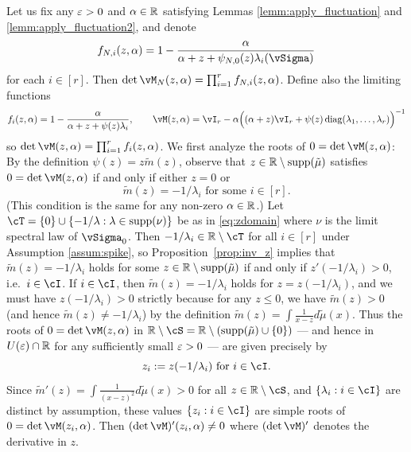 \begin{proof-of-theorem}
Let us fix any $\varepsilon>0$ and $\alpha \in \mathbb{R}$ satisfying Lemmas
\ref{lemm:apply_fluctuation} and \ref{lemm:apply_fluctuation2}, and denote 
\[f_{N,i}(z,\alpha)=1-\frac{\alpha}{\alpha+z+\psi_{N,0}(z)\lambda_i(\vSigma)}\]
for each $i \in [r]$.
Then $\det\vM_N(z,\alpha)=\prod_{i=1}^r f_{N,i}(z,\alpha)$. Define also the
limiting functions
\[f_i(z,\alpha)=1-\frac{\alpha}{\alpha+z+\psi(z)\lambda_i},
\qquad \vM(z,\alpha)=\vI_r-\alpha\Big((\alpha+z)\vI_r+\psi(z)
\diag(\lambda_1,\ldots,\lambda_r)\Big)^{-1}\]
so $\det \vM(z,\alpha)=\prod_{i=1}^r f_i(z,\alpha)$.
We first analyze the roots of $0=\det \vM(z,\alpha)$: By the
definition $\psi(z)=z\tilde m(z)$, observe that $z \in \mathbb{R}
\setminus \mathrm{supp}({\tilde \mu})$ satisfies $0=\det \vM(z,\alpha)$ if and only if
either $z=0$ or 
\[\tilde m(z)=-1/\lambda_i \text{ for some } i \in [r].\]
(This condition is the same for any non-zero $\alpha \in \mathbb{R}$.)
Let $\cT=\{0\} \cup \{-1/\lambda:\lambda \in \supp{\nu}\}$ be as in
\eqref{eq:zdomain} where $\nu$ is the limit spectral law of $\vSigma_0$.
Then $-1/\lambda_i \in \R \setminus \cT$ for all $i \in [r]$ under Assumption \ref{assum:spike}, so
Proposition~\ref{prop:inv_z} implies that $\tilde m(z)=-1/\lambda_i$ holds
for some $z \in \mathbb{R} \setminus \mathrm{supp}({\tilde \mu})$ if and only if
$z'(-1/\lambda_i)>0$, i.e.\ $i \in \cI$. If $i \in \cI$, then
$\tilde m(z)=-1/\lambda_i$ holds for $z=z(-1/\lambda_i)$,
and we must have $z(-1/\lambda_i)>0$ strictly because for any $z \leq 0$,
we have $\tilde m(z)>0$
(and hence $\tilde m(z) \neq -1/\lambda_i$)
by the definition $\tilde m(z)=\int \frac{1}{x-z}d\tilde \mu(x)$.
Thus the roots of $0=\det \vM(z,\alpha)$ in $\R \setminus \cS=\R \setminus
(\supp{\tilde \mu} \cup \{0\})$ --- and hence
in $U(\varepsilon) \cap \mathbb{R}$ for any sufficiently small $\varepsilon>0$ --- are given
precisely by
\[z_i:=z(-1/\lambda_i) \text{ for } i \in \cI.\]
Since $\tilde m'(z)=\int \frac{1}{(x-z)^2}d\tilde \mu(x)>0$
for all $z \in \R \setminus \cS$, and $\{\lambda_i:i \in \cI\}$ are
distinct by assumption, these values $\{z_i:i \in \cI\}$ are simple roots of
$0=\det \vM(z_i,\alpha)$. Then
$(\det \vM)'(z_i,\alpha) \neq 0$ where $(\det \vM)'$ denotes the derivative in
$z$.


\end{proof-of-theorem}
